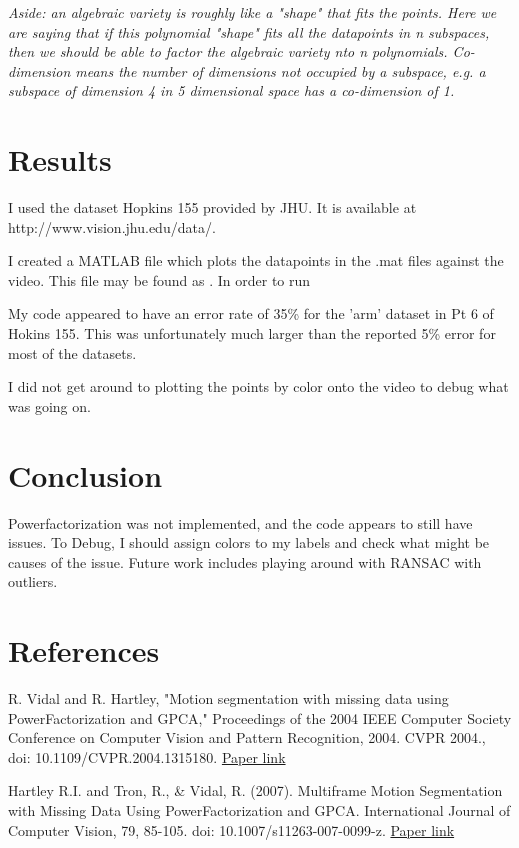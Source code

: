 \documentclass[a4paper]{article}
\begin{document}
 \textit{Aside: an algebraic variety is roughly like a "shape" that fits the
 points. Here we are saying that if this polynomial "shape" fits all the
 datapoints in n subspaces,
 then we should be able to factor the algebraic variety nto n polynomials.  Co-dimension means the number of dimensions not occupied by a subspace, e.g. a subspace of dimension 4 in 5 dimensional space has a co-dimension of 1. }
\section{Results}

I used the dataset Hopkins 155 provided by JHU. It is available at http://www.vision.jhu.edu/data/.

I created a MATLAB file which plots the datapoints in the .mat files against the
video. This file may be found as . In order to run

My code appeared to have an error rate of 35\% for the 'arm' dataset in Pt 6 of
Hokins 155. This was unfortunately much larger than the reported 5\% error for
most of the datasets.

I did not get around to plotting the points by color onto the video to debug
what was going on.


\section{Conclusion}

Powerfactorization was not implemented, and the code appears to still have
issues. To Debug, I should assign colors to my labels and check what might be
causes of the issue.
Future work includes playing around with RANSAC with outliers.


\section{References}

 
R. Vidal and R. Hartley, "Motion segmentation with missing data using
PowerFactorization and GPCA," Proceedings of the 2004 IEEE Computer Society
Conference on Computer Vision and Pattern Recognition, 2004. CVPR 2004., doi:
10.1109/CVPR.2004.1315180.
\href{http://vision.jhu.edu/assets/VidalCVPR04.pdf}{Paper link}

\bigskip

\noindent 
Hartley R.I. and Tron, R., \& Vidal, R. (2007). Multiframe Motion Segmentation
with Missing Data Using PowerFactorization and GPCA. International Journal of
Computer Vision, 79, 85-105. doi: 10.1007/s11263-007-0099-z.
\href{https://pdfs.semanticscholar.org/322b/3feffe79585c112c6a0d86c05909634ac7c5.pdf}{Paper
link}





\end{document}
